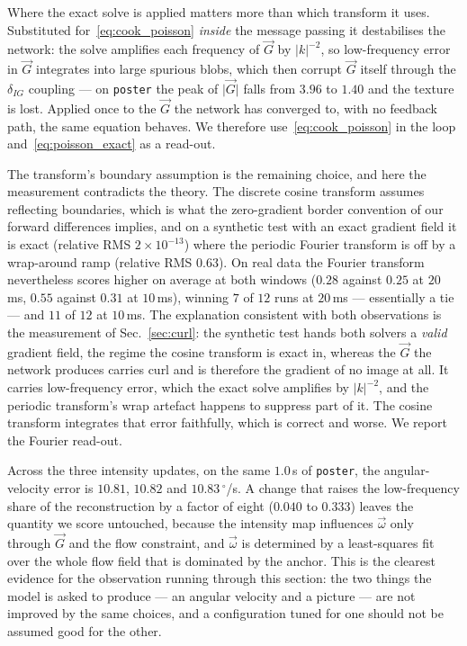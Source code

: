 \documentclass[journal]{IEEEtran}
\newcommand{\Gmap}{\vec{G}}
\newcommand{\wvec}{\vec{\omega}}
\begin{document}
Where the exact solve is applied matters more than which transform it uses.
Substituted for~\eqref{eq:cook_poisson} \emph{inside} the message passing it
destabilises the network: the solve amplifies each frequency of $\Gmap$ by
$\lvert k\rvert^{-2}$, so low-frequency error in $\Gmap$ integrates into large
spurious blobs, which then corrupt $\Gmap$ itself through the $\delta_{I\!G}$
coupling --- on \texttt{poster} the peak of $\lvert\Gmap\rvert$ falls from
$3.96$ to $1.40$ and the texture is lost. Applied once to the $\Gmap$ the
network has converged to, with no feedback path, the same equation behaves.
We therefore use~\eqref{eq:cook_poisson} in the loop and~\eqref{eq:poisson_exact}
as a read-out.

The transform's boundary assumption is the remaining choice, and here the
measurement contradicts the theory. The discrete cosine transform assumes
reflecting boundaries, which is what the zero-gradient border convention of our
forward differences implies, and on a synthetic test with an exact gradient
field it is exact (relative RMS $2\!\times\!10^{-13}$) where the periodic Fourier
transform is off by a wrap-around ramp (relative RMS $0.63$). On real data the
Fourier transform nevertheless scores higher on average at both windows
($0.28$ against $0.25$ at $20$\,ms, $0.55$ against $0.31$ at $10$\,ms),
winning $7$ of $12$ runs at $20$\,ms --- essentially a tie --- and $11$ of $12$
at $10$\,ms. The explanation consistent with both observations is the
measurement of Sec.~\ref{sec:curl}: the synthetic test hands both solvers a
\emph{valid} gradient field, the regime the cosine transform is exact in,
whereas the $\Gmap$ the network produces carries curl and is therefore the
gradient of no image at all. It carries low-frequency error, which the exact solve amplifies by
$\lvert k\rvert^{-2}$, and the periodic transform's wrap artefact happens to
suppress part of it. The cosine transform integrates that error faithfully,
which is correct and worse. We report the Fourier read-out.

Across the three intensity updates, on the same $1.0$\,s of \texttt{poster},
the angular-velocity error is $10.81$, $10.82$ and $10.83$\,$^\circ$/s. A
change that raises the low-frequency share of the reconstruction by a factor
of eight ($0.040$ to $0.333$) leaves the quantity we score untouched,
because the intensity map influences $\wvec$ only through $\Gmap$ and the flow
constraint, and $\wvec$ is determined by a least-squares fit over the whole flow
field that is dominated by the anchor. This is the clearest evidence for the
observation running through this section: the two things the model is asked to
produce --- an angular velocity and a picture --- are not improved by the same
choices, and a configuration tuned for one should not be assumed good for the
other.
\end{document}
